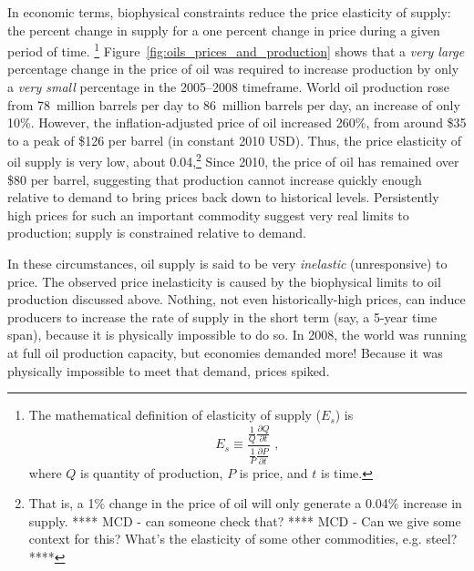 In economic terms, biophysical constraints reduce the 
price elasticity of supply: 
the percent change in supply for a one percent change in price
during a given period of time.%
	\footnote{
	The mathematical definition of elasticity of supply ($E_s$) is
	\begin{equation*}
		E_s \equiv \frac{\frac{1}{Q}\frac{\partial Q}{\partial t}}
					{\frac{1}{P}\frac{\partial P}{\partial t}} \; ,
	\end{equation*}%
	where $Q$ is quantity of production, $P$ is price, and $t$ is time.
	}
Figure~\ref{fig:oils_prices_and_production} shows that 
a \emph{very large} percentage change in the price of oil was required to 
increase production by only a \emph{very small} percentage
in the 2005--2008 timeframe.
World oil production rose from 
78~million barrels per day to 86~million barrels per day,
an increase of only 10\%.\cite{EIA2014}
However, the inflation-adjusted price of oil increased 260\%,
from around \$35 to a peak of \$126 per barrel 
(in constant 2010 USD).
Thus, the price elasticity of oil supply is very low, about 0.04,\footnote{That is, a 1\% change in the price of oil will only generate a 0.04\% 			increase in supply.
	****
	MCD - can someone check that?
	**** 
	MCD - Can we give some context for this?
	What's the elasticity of some other commodities, e.g. steel?
	****
	}
Since 2010, the price of oil has remained over \$80 per barrel,
suggesting that production cannot increase quickly enough relative to demand
to bring prices back down to historical levels.
Persistently high prices for such an important commodity
suggest very real limits to production; 
supply is constrained relative to demand. 

In these circumstances, 
oil supply is said to be very \emph{inelastic} (unresponsive) to price.
The observed price inelasticity is caused by 
the biophysical limits to oil production discussed above.
Nothing, not even historically-high prices, can induce producers to 
increase the rate of supply in the short term (say, a 5-year time span), 
because it is physically impossible to do so.
In 2008, the world was running at full oil production capacity, 
but economies demanded more!
Because it was physically impossible to meet that demand,
prices spiked.

